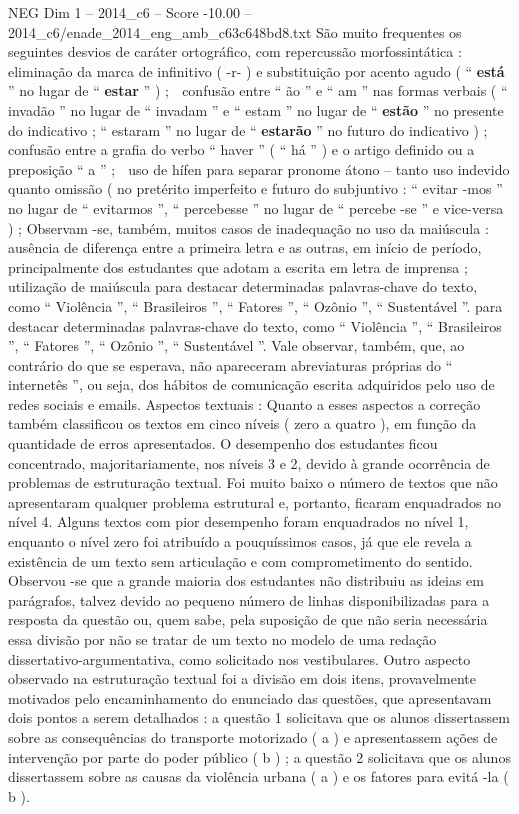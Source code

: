 \begin{textsample}{NEG Dim 1 – 2014\_c6 – Score -10.00 – 2014\_c6/enade\_2014\_eng\_amb\_c63c648bd8.txt}
São muito frequentes os seguintes desvios de caráter ortográfico, com repercussão morfossintática :  eliminação da marca de infinitivo ( -r- ) e substituição por acento agudo ( “ \textbf{está} ” no lugar de “ \textbf{estar} ” ) ;  confusão entre “ ão ” e “ am ” nas formas verbais ( “ invadão ” no lugar de “ invadam ” e “ estam ” no lugar de “ \textbf{estão} ” no presente do indicativo ; “ estaram ” no lugar de “ \textbf{estarão} ” no futuro do indicativo ) ;  confusão entre a grafia do verbo “ haver ” ( “ há ” ) e o artigo definido ou a preposição “ a ” ;  uso de hífen para separar pronome átono – tanto uso indevido quanto omissão ( no pretérito imperfeito e futuro do subjuntivo : “ evitar -mos ” no lugar de “ evitarmos ”, “ percebesse ” no lugar de “ percebe -se ” e vice-versa ) ; Observam -se, também, muitos casos de inadequação no uso da maiúscula : ausência de diferença entre a primeira letra e as outras, em início de período, principalmente dos estudantes que adotam a escrita em letra de imprensa ; utilização de maiúscula para destacar determinadas palavras-chave do texto, como “ Violência ”, “ Brasileiros ”, “ Fatores ”, “ Ozônio ”, “ Sustentável ”. para destacar determinadas palavras-chave do texto, como “ Violência ”, “ Brasileiros ”, “ Fatores ”, “ Ozônio ”, “ Sustentável ”.
Vale observar, também, que, ao contrário do que se esperava, não apareceram abreviaturas próprias do “ internetês ”, ou seja, dos hábitos de comunicação escrita adquiridos pelo uso de redes sociais e emails.
Aspectos textuais : Quanto a esses aspectos a correção também classificou os textos em cinco níveis ( zero a quatro ), em função da quantidade de erros apresentados.
O desempenho dos estudantes ficou concentrado, majoritariamente, nos níveis 3 e 2, devido à grande ocorrência de problemas de estruturação textual.
Foi muito baixo o número de textos que não apresentaram qualquer problema estrutural e, portanto, ficaram enquadrados no nível 4.
Alguns textos com pior desempenho foram enquadrados no nível 1, enquanto o nível zero foi atribuído a pouquíssimos casos, já que ele revela a existência de um texto sem articulação e com comprometimento do sentido.
Observou -se que a grande maioria dos estudantes não distribuiu as ideias em parágrafos, talvez devido ao pequeno número de linhas disponibilizadas para a resposta da questão ou, quem sabe, pela suposição de que não seria necessária essa divisão por não se tratar de um texto no modelo de uma redação dissertativo-argumentativa, como solicitado nos vestibulares.
Outro aspecto observado na estruturação textual foi a divisão em dois itens, provavelmente motivados pelo encaminhamento do enunciado das questões, que apresentavam dois pontos a serem detalhados : a questão 1 solicitava que os alunos dissertassem sobre as consequências do transporte motorizado ( a ) e apresentassem ações de intervenção por parte do poder público ( b ) ; a questão 2 solicitava que os alunos dissertassem sobre as causas da violência urbana ( a ) e os fatores para evitá -la ( b ).

\end{textsample}
